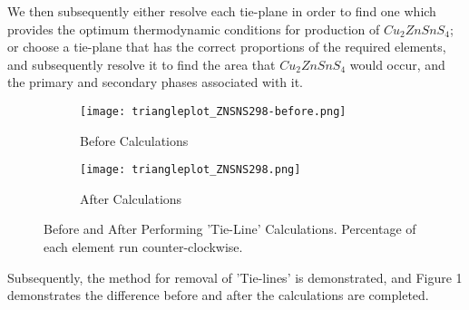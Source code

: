 We then subsequently either resolve each tie-plane in order to find one which provides the optimum thermodynamic conditions for production of $Cu_2ZnSnS_4$; or choose a tie-plane that has the correct proportions of the required elements, and subsequently resolve it to find the area that $Cu_2ZnSnS_4$ would occur, and the primary and secondary phases associated with it.

\begin{figure}
\centering
\begin{subfigure}{80mm}
  \centering
    \texttt{[image: triangleplot\_ZNSNS298-before.png]}
    \caption{Before Calculations}
    \label{fig:ZnSnSBefore}
\end{subfigure}%
\begin{subfigure}{80mm}
 \centering
    \texttt{[image: triangleplot\_ZNSNS298.png]}
    \caption{After Calculations}
    \label{fig:ZnSnS}
\end{subfigure}
\caption{Before and After Performing 'Tie-Line' Calculations. Percentage of each element run counter-clockwise.}
\label{fig:ZnSnSFigures}
\end{figure}

Subsequently, the method for removal of 'Tie-lines' is demonstrated, and Figure 1 demonstrates the difference before and after the calculations are completed.

